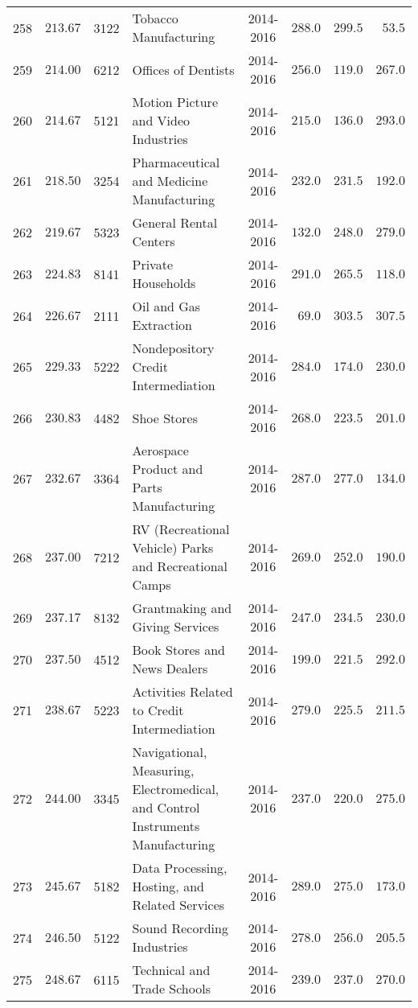\documentclass[9pt, oneside]{article}   	%
\begin{document}
\begin{longtable}{cccp{2.0in}cccc}
258  & $213.67$ & 3122 & Tobacco Manufacturing & 2014-2016 & $288.0$ & $299.5$ & $\phantom{0}53.5$ \\
259  & $214.00$ & 6212 & Offices of Dentists & 2014-2016 & $256.0$ & $119.0$ & $267.0$ \\
260  & $214.67$ & 5121 & Motion Picture and Video Industries & 2014-2016 & $215.0$ & $136.0$ & $293.0$ \\
261  & $218.50$ & 3254 & Pharmaceutical and Medicine Manufacturing & 2014-2016 & $232.0$ & $231.5$ & $192.0$ \\
262  & $219.67$ & 5323 & General Rental Centers & 2014-2016 & $132.0$ & $248.0$ & $279.0$ \\
263  & $224.83$ & 8141 & Private Households & 2014-2016 & $291.0$ & $265.5$ & $118.0$ \\
264  & $226.67$ & 2111 & Oil and Gas Extraction & 2014-2016 & $\phantom{0}69.0$ & $303.5$ & $307.5$ \\
265  & $229.33$ & 5222 & Nondepository Credit Intermediation & 2014-2016 & $284.0$ & $174.0$ & $230.0$ \\
266  & $230.83$ & 4482 & Shoe Stores & 2014-2016 & $268.0$ & $223.5$ & $201.0$ \\
267  & $232.67$ & 3364 & Aerospace Product and Parts Manufacturing & 2014-2016 & $287.0$ & $277.0$ & $134.0$ \\
268  & $237.00$ & 7212 & RV (Recreational Vehicle) Parks and Recreational Camps & 2014-2016 & $269.0$ & $252.0$ & $190.0$ \\
269  & $237.17$ & 8132 & Grantmaking and Giving Services & 2014-2016 & $247.0$ & $234.5$ & $230.0$ \\
270  & $237.50$ & 4512 & Book Stores and News Dealers & 2014-2016 & $199.0$ & $221.5$ & $292.0$ \\
271  & $238.67$ & 5223 & Activities Related to Credit Intermediation & 2014-2016 & $279.0$ & $225.5$ & $211.5$ \\
272  & $244.00$ & 3345 & Navigational, Measuring, Electromedical, and Control Instruments Manufacturing & 2014-2016 & $237.0$ & $220.0$ & $275.0$ \\
273  & $245.67$ & 5182 & Data Processing, Hosting, and Related Services & 2014-2016 & $289.0$ & $275.0$ & $173.0$ \\
274  & $246.50$ & 5122 & Sound Recording Industries & 2014-2016 & $278.0$ & $256.0$ & $205.5$ \\
275  & $248.67$ & 6115 & Technical and Trade Schools & 2014-2016 & $239.0$ & $237.0$ & $270.0$ \\

\end{longtable}
\end{document}
